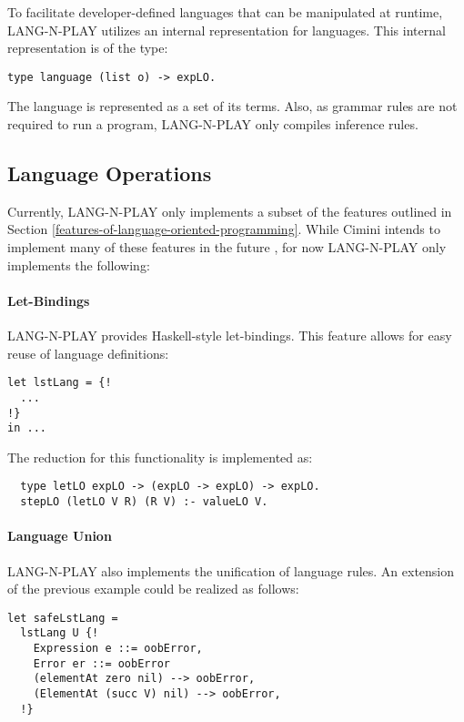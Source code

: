 To facilitate developer-defined languages that can be manipulated at runtime, LANG-N-PLAY utilizes an internal representation for languages. This internal representation is of the type:

\begin{lstlisting}
type language (list o) -> expLO.
\end{lstlisting}

The language is represented as a set of its terms. Also, as grammar rules are not required to run a program, LANG-N-PLAY only compiles inference rules.


\subsection{Language Operations}
Currently, LANG-N-PLAY only implements a subset of the features outlined in Section \ref{features-of-language-oriented-programming}. While Cimini intends to implement many of these features in the future \cite{cimini_effectiveness_2020}, for now LANG-N-PLAY only implements the following:

\paragraph{Let-Bindings}
LANG-N-PLAY provides Haskell-style let-bindings. This feature allows for easy reuse of language definitions:

\begin{lstlisting}
let lstLang = {!
  ...
!}
in ...
\end{lstlisting}

The reduction for this functionality is implemented as:

\begin{lstlisting}
  type letLO expLO -> (expLO -> expLO) -> expLO.
  stepLO (letLO V R) (R V) :- valueLO V.
\end{lstlisting}

\paragraph{Language Union}
LANG-N-PLAY also implements the unification of language rules. An extension of the previous example could be realized as follows:

\begin{lstlisting}
let safeLstLang = 
  lstLang U {!
    Expression e ::= oobError,
    Error er ::= oobError
    (elementAt zero nil) --> oobError,
    (ElementAt (succ V) nil) --> oobError,
  !}
\end{lstlisting}

